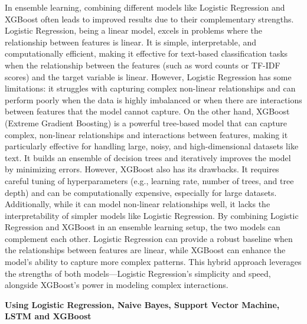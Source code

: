 \noindent
In ensemble learning, combining different models like Logistic Regression and XGBoost often leads to improved results due to their complementary strengths. Logistic Regression, being a linear model, excels in problems where the relationship between features is linear. It is simple, interpretable, and computationally efficient, making it effective for text-based classification tasks when the relationship between the features (such as word counts or TF-IDF scores) and the target variable is linear. However, Logistic Regression has some limitations: it struggles with capturing complex non-linear relationships and can perform poorly when the data is highly imbalanced or when there are interactions between features that the model cannot capture. On the other hand, XGBoost (Extreme Gradient Boosting) is a powerful tree-based model that can capture complex, non-linear relationships and interactions between features, making it particularly effective for handling large, noisy, and high-dimensional datasets like text. It builds an ensemble of decision trees and iteratively improves the model by minimizing errors. However, XGBoost also has its drawbacks. It requires careful tuning of hyperparameters (e.g., learning rate, number of trees, and tree depth) and can be computationally expensive, especially for large datasets. Additionally, while it can model non-linear relationships well, it lacks the interpretability of simpler models like Logistic Regression. By combining Logistic Regression and XGBoost in an ensemble learning setup, the two models can complement each other. Logistic Regression can provide a robust baseline when the relationships between features are linear, while XGBoost can enhance the model's ability to capture more complex patterns. This hybrid approach leverages the strengths of both models—Logistic Regression's simplicity and speed, alongside XGBoost's power in modeling complex interactions.

\pagebreak
\noindent
\textbf{Using Logistic Regression, Naive Bayes, Support Vector Machine, LSTM and XGBoost}



